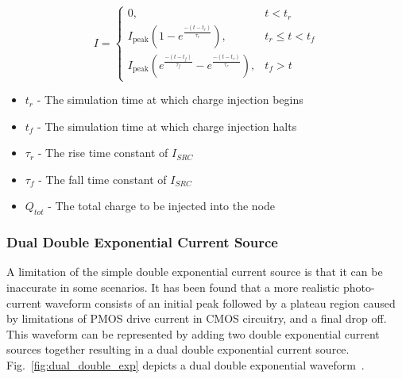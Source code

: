 \documentclass[conference]{IEEEtran}
\begin{document}
    \begin{equation}
        I = \begin{cases}
                      0, & t < t_r \\
                      I_{\text{peak}}\left(1 - e^{\frac{-(t - t_r)}{\tau_r}}\right), & t_r \leq t < t_f \\
                      I_{\text{peak}}\left(e^{\frac{-(t - t_f)}{\tau_f}} - e^{\frac{-(t - t_r)}{\tau_r}}\right), & t_f > t
        \end{cases}\label{eq:ISRC}
    \end{equation}
    
	\vspace{1em}
    
    \begin{itemize}
        \item[] \(t_r\) - The simulation time at which charge injection begins

        \item[] \(t_f\) - The simulation time at which charge injection halts

        \item[] \(\tau_r\) - The rise time constant of \(I_{SRC}\)

        \item[] \(\tau_f\) - The fall time constant of \(I_{SRC}\)

        \item[] \(Q_{tot}\) - The total charge to be injected into the node
    \end{itemize}
    
    \vspace{1em}

    \subsubsection{Dual Double Exponential Current Source}
    A limitation of the simple double exponential current source is that it can be inaccurate in some scenarios.
    It has been found that a more realistic photo-current waveform consists of an initial peak followed by a plateau region caused by limitations of PMOS drive current in CMOS circuitry, and a final drop off.
    This waveform can be represented by adding two double exponential current sources together resulting in a dual double exponential current source.
    Fig.~\ref{fig:dual_double_exp} depicts a dual double exponential waveform~\cite{Black2015}.
\end{document}
